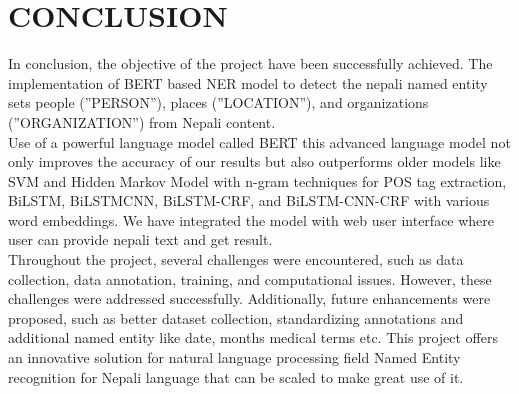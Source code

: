 \chapter{CONCLUSION}












    
    



In conclusion, the objective of the project have been successfully achieved. The implementation of BERT based NER model to detect the nepali named entity sets people (”PERSON”), places (”LOCATION”), and organizations (”ORGANIZATION”) from Nepali content.\\

Use of a powerful language model called BERT this advanced language model not only improves the accuracy of our
results but also outperforms older models like SVM and Hidden Markov Model with
n-gram techniques for POS tag extraction, BiLSTM, BiLSTMCNN, BiLSTM-CRF, and
BiLSTM-CNN-CRF with various word embeddings.
We have integrated the model with web user interface where user can provide nepali text and get result.\\
 
 Throughout the project, several challenges were encountered, such as data collection, 
data annotation, training, and computational issues. However, these challenges were addressed successfully. Additionally, future enhancements were 
proposed, such as better dataset collection, standardizing annotations and additional named entity like date, months medical terms etc. This project offers an innovative solution for natural language processing field Named Entity recognition for Nepali language that can be scaled to make great use of it.
